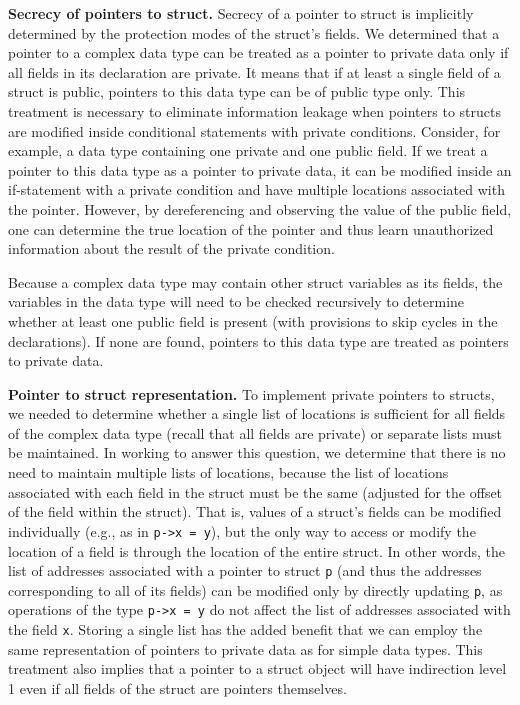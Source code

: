 \documentclass[11pt]{article}
\begin{document}
\medskip \noindent \textbf{Secrecy of pointers to struct.} Secrecy of a
pointer to struct is implicitly determined by the protection modes of the
struct's fields. We determined that a pointer to a complex data type can be
treated as a pointer to private data only if all fields in its declaration
are private. It means that if at least a single field of a struct is public,
pointers to this data type can be of public type only. This treatment is
necessary to eliminate information leakage when pointers to structs are
modified inside conditional statements with private conditions. Consider,
for example, a data type containing one private and one public field. If we
treat a pointer to this data type as a pointer to private data, it can be
modified inside an if-statement with a private condition and have multiple
locations associated with the pointer. However, by dereferencing and
observing the value of the public field, one can determine the true location
of the pointer and thus learn unauthorized information about the result of
the private condition.

Because a complex data type may contain other struct variables as its
fields, the variables in the data type will need to be checked recursively
to determine whether at least one public field is present (with provisions
to skip cycles in the declarations). If none are found, pointers to this
data type are treated as pointers to private data.

\medskip \noindent \textbf{Pointer to struct representation.} To implement
private pointers to structs, we needed to determine whether a single list of
locations is sufficient for all fields of the complex data type (recall that
all fields are private) or separate lists must be maintained. In working to
answer this question, we determine that there is no need to maintain
multiple lists of locations, because the list of locations associated with
each field in the struct must be the same (adjusted for the offset of the
field within the struct). That is, values of a struct's fields can be
modified individually (e.g., as in \texttt{p->x = y}), but the only way to
access or modify the location of a field is through the location of the
entire struct. In other words, the list of addresses associated with a
pointer to struct \texttt{p} (and thus the addresses corresponding to all of
its fields) can be modified only by directly updating \texttt{p}, as
operations of the type \texttt{p->x = y} do not affect the list of addresses
associated with the field \texttt{x}. Storing a single list has the added
benefit that we can employ the same representation of pointers to private
data as for simple data types. This treatment also implies that a pointer to
a struct object will have indirection level 1 even if all fields of the
struct are pointers themselves.
\end{document}
